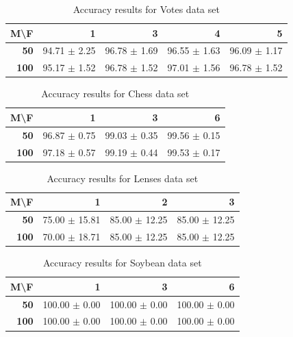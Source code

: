 \documentclass[journal, a4paper]{IEEEtran}
\begin{document}
\begin{table}[htbp]
\caption{Accuracy results for Votes data set}
\begin{center}
\begin{tabular}{|r|r|r|r|r|}
\hline
\textbf{M\textbackslash{}F} & \textbf{1} & \textbf{3} & \textbf{4} & \textbf{5} \\ \hline
\textbf{50} & 94.71 $ \pm $ 2.25 & 96.78 $ \pm $ 1.69 & 96.55 $ \pm $ 1.63 & 96.09 $ \pm $ 1.17 \\ \hline
\textbf{100} & 95.17 $ \pm $ 1.52 & 96.78 $ \pm $ 1.52 & 97.01 $ \pm $ 1.56 & 96.78 $ \pm $ 1.52 \\ \hline
\end{tabular}
\end{center}
\label{tab:acc-votes}
\end{table}

\begin{table}[htbp]
\caption{Accuracy results for Chess data set}
\begin{center}
\begin{tabular}{|r|r|r|r|}
\hline
\textbf{M\textbackslash{}F} & \textbf{1} & \textbf{3} & \textbf{6} \\ \hline
\textbf{50} & 96.87 $ \pm $ 0.75 & 99.03 $ \pm $ 0.35 & 99.56 $ \pm $ 0.15 \\ \hline
\textbf{100} & 97.18 $ \pm $ 0.57 & 99.19 $ \pm $ 0.44 & 99.53 $ \pm $ 0.17 \\ \hline
\end{tabular}
\end{center}
\label{tab:acc-chess}
\end{table}

\begin{table}[htbp]
\caption{Accuracy results for Lenses data set}
\begin{center}
\begin{tabular}{|r|r|r|r|}
\hline
\textbf{M\textbackslash{}F} & \textbf{1} & \textbf{2} & \textbf{3} \\ \hline
\textbf{50} & 75.00 $ \pm $ 15.81 & 85.00 $ \pm $ 12.25 & 85.00 $ \pm $ 12.25 \\ \hline
\textbf{100} & 70.00 $ \pm $ 18.71 & 85.00 $ \pm $ 12.25 & 85.00 $ \pm $ 12.25 \\ \hline
\end{tabular}
\end{center}
\label{tab:acc-lenses}
\end{table}

\begin{table}[htbp]
\caption{Accuracy results for Soybean data set}
\begin{center}
\begin{tabular}{|r|r|r|r|}
\hline
\textbf{M\textbackslash{}F} & \textbf{1} & \textbf{3} & \textbf{6} \\ \hline
\textbf{50} & 100.00 $ \pm $ 0.00 & 100.00 $ \pm $ 0.00 & 100.00 $ \pm $ 0.00 \\ \hline
\textbf{100} & 100.00 $ \pm $ 0.00 & 100.00 $ \pm $ 0.00 & 100.00 $ \pm $ 0.00 \\ \hline
\end{tabular}
\end{center}
\label{tab:acc-soybean}
\end{table}
\end{document}
